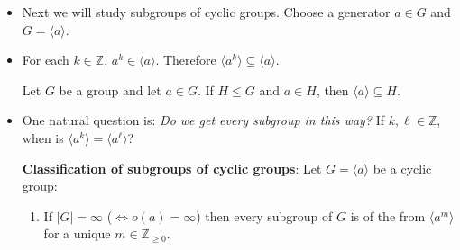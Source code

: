 \begin{itemize}
\begin{proof}
        If there exists $m \in \mathbb{Z}_{>0}$ such that $mk = \lcm(n,k)$, then $m=o(a^k)$. Recall that:
        \begin{equation}
            \frac{nk}{\gcd(n,k)} = \lcm(n,k)
        \end{equation}
        Since $\gcd(n,k) | n$, then $\frac{n}{\gcd(n,k)} \in \mathbb{Z}_{>0}$ with
        \begin{equation}
            \left(\frac{n}{\gcd(n,k)}\right)k = \lcm(n,k)
        \end{equation}
        Therefore:
        \begin{equation}
            o(a^k) = \frac{n}{\gcd(n,k)}
        \end{equation}
    \end{proof}
    \begin{corollary}
        In a finite group $G$, the order of every element divides the order of the group:
        \begin{equation}
            \forall x \in G,\quad o(x) \Big| |G|
        \end{equation}
    \end{corollary}
    \begin{example}
        $\mathbb{Z}=\langle 1\rangle$ is an infinite cyclic group. Meanwhile, $\mathbb{Z}/n\mathbb{Z} = \langle 1 \rangle$ is a finite cyclic group.
    \end{example}
    \item Next we will study subgroups of cyclic groups. Choose a generator $a \in G$ and $G=\langle a \rangle$.
    \item For each $k \in \mathbb{Z}$, $a^k \in \langle a\rangle$. Therefore $\langle a^k \rangle \subseteq \langle a\rangle$.
    \begin{proposition}
        Let $G$ be a group and let $a\in G$. If $H \le G$ and $a\in H$, then $\langle a \rangle \subseteq H$.
    \end{proposition}
    \item One natural question is: \textit{Do we get every subgroup in this way?} If $k,\ell \in \mathbb{Z}$, when is $\langle a^k\rangle = \langle a^\ell \rangle$?
    \begin{theorem}
        \textbf{Classification of subgroups of cyclic groups}: Let $G=\langle a\rangle$ be a cyclic group:
        \begin{enumerate}
            \item If $|G|=\infty$ ($\iff o(a) = \infty$) then every subgroup of $G$ is of the from $\langle a^m \rangle$ for a unique $m \in \mathbb{Z}_{\ge 0}$.
            

\end{enumerate}
\end{theorem}
\end{itemize}
